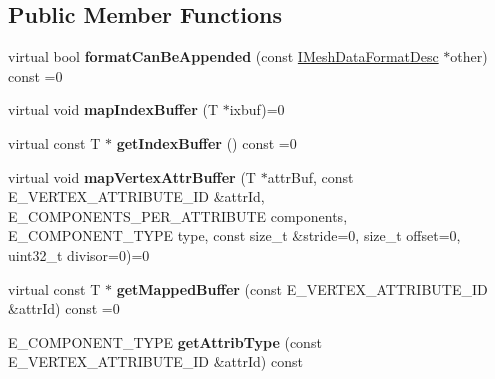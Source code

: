 \subsection*{Public Member Functions}
\begin{DoxyCompactItemize}
\item 
virtual bool {\bfseries format\+Can\+Be\+Appended} (const \hyperlink{classirr_1_1scene_1_1IMeshDataFormatDesc}{I\+Mesh\+Data\+Format\+Desc} $\ast$other) const  =0\hypertarget{classirr_1_1scene_1_1IMeshDataFormatDesc_a4b51403b1c2c43f14ad2d17d4610b8d4}{}\label{classirr_1_1scene_1_1IMeshDataFormatDesc_a4b51403b1c2c43f14ad2d17d4610b8d4}

\item 
virtual void {\bfseries map\+Index\+Buffer} (T $\ast$ixbuf)=0\hypertarget{classirr_1_1scene_1_1IMeshDataFormatDesc_aa0dfd0c43df0141a3cb3b390ced4fb0c}{}\label{classirr_1_1scene_1_1IMeshDataFormatDesc_aa0dfd0c43df0141a3cb3b390ced4fb0c}

\item 
virtual const T $\ast$ {\bfseries get\+Index\+Buffer} () const  =0\hypertarget{classirr_1_1scene_1_1IMeshDataFormatDesc_af3e0c28174c2ed19961ec499d1265f3b}{}\label{classirr_1_1scene_1_1IMeshDataFormatDesc_af3e0c28174c2ed19961ec499d1265f3b}

\item 
virtual void {\bfseries map\+Vertex\+Attr\+Buffer} (T $\ast$attr\+Buf, const E\+\_\+\+V\+E\+R\+T\+E\+X\+\_\+\+A\+T\+T\+R\+I\+B\+U\+T\+E\+\_\+\+ID \&attr\+Id, E\+\_\+\+C\+O\+M\+P\+O\+N\+E\+N\+T\+S\+\_\+\+P\+E\+R\+\_\+\+A\+T\+T\+R\+I\+B\+U\+TE components, E\+\_\+\+C\+O\+M\+P\+O\+N\+E\+N\+T\+\_\+\+T\+Y\+PE type, const size\+\_\+t \&stride=0, size\+\_\+t offset=0, uint32\+\_\+t divisor=0)=0\hypertarget{classirr_1_1scene_1_1IMeshDataFormatDesc_a00500097ec5a89aa60dc0c9db737ab99}{}\label{classirr_1_1scene_1_1IMeshDataFormatDesc_a00500097ec5a89aa60dc0c9db737ab99}

\item 
virtual const T $\ast$ {\bfseries get\+Mapped\+Buffer} (const E\+\_\+\+V\+E\+R\+T\+E\+X\+\_\+\+A\+T\+T\+R\+I\+B\+U\+T\+E\+\_\+\+ID \&attr\+Id) const  =0\hypertarget{classirr_1_1scene_1_1IMeshDataFormatDesc_a969a5fb222ac95993e3b7c3bfa9f6adf}{}\label{classirr_1_1scene_1_1IMeshDataFormatDesc_a969a5fb222ac95993e3b7c3bfa9f6adf}

\item 
E\+\_\+\+C\+O\+M\+P\+O\+N\+E\+N\+T\+\_\+\+T\+Y\+PE {\bfseries get\+Attrib\+Type} (const E\+\_\+\+V\+E\+R\+T\+E\+X\+\_\+\+A\+T\+T\+R\+I\+B\+U\+T\+E\+\_\+\+ID \&attr\+Id) const \hypertarget{classirr_1_1scene_1_1IMeshDataFormatDesc_a63473bd4cb2c740272fc3f132fa13ea4}{}\label{classirr_1_1scene_1_1IMeshDataFormatDesc_a63473bd4cb2c740272fc3f132fa13ea4}


\end{DoxyCompactItemize}
